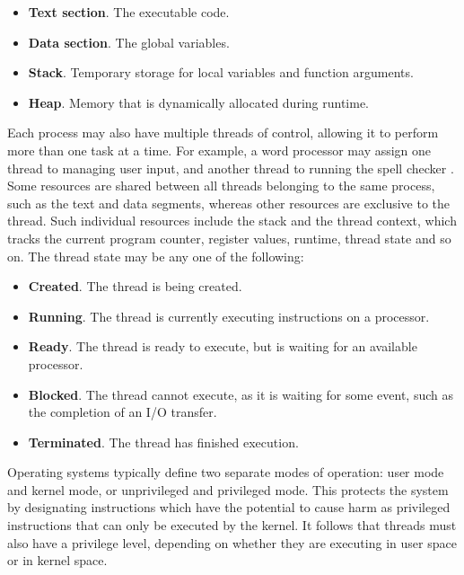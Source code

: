 \documentclass[bsc,frontabs,singlespacing,parskip,deptreport]{infthesis}
\begin{document}
\begin{itemize}
    \item{\textbf{Text section}. The executable code.}
    \item{\textbf{Data section}. The global variables.}
    \item{\textbf{Stack}. Temporary storage for local variables and function arguments.}
    \item{\textbf{Heap}. Memory that is dynamically allocated during runtime.}
\end{itemize}

Each process may also have multiple threads of control, allowing it to perform more than one task at a time. For example, a word processor may assign one thread to managing user input, and another thread to running the spell checker \cite{silberschatz}. Some resources are shared between all threads belonging to the same process, such as the text and data segments, whereas other resources are exclusive to the thread. Such individual resources include the stack and the thread context, which tracks the current program counter, register values, runtime, thread state and so on. The thread state may be any one of the following:

\begin{itemize}
    \item{\textbf{Created}. The thread is being created.}
    \item{\textbf{Running}. The thread is currently executing instructions on a processor.}
    \item{\textbf{Ready}. The thread is ready to execute, but is waiting for an available processor.}
    \item{\textbf{Blocked}. The thread cannot execute, as it is waiting for some event, such as the completion of an I/O transfer.}
    \item{\textbf{Terminated}. The thread has finished execution.}
\end{itemize}

Operating systems typically define two separate modes of operation: user mode and kernel mode, or unprivileged and privileged mode. This protects the system by designating instructions which have the potential to cause harm as privileged instructions that can only be executed by the kernel. It follows that threads must also have a privilege level, depending on whether they are executing in user space or in kernel space.
\end{document}
